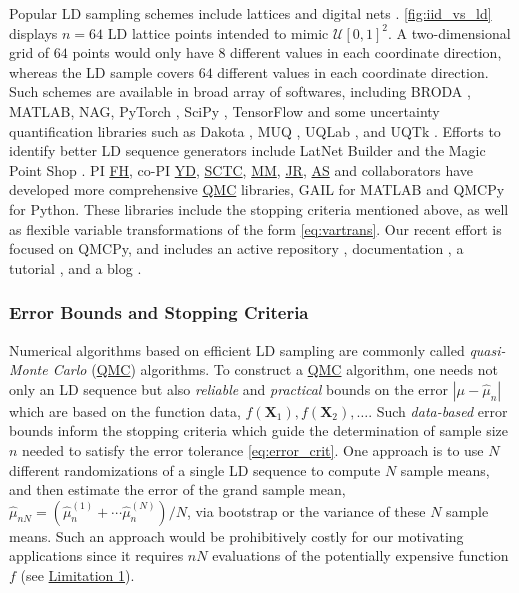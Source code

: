 \documentclass[11pt]{NSFamsart}
\newcommand{\FH}{\hyperlink{FHlink}{FH}\xspace}
\newcommand{\SCTC}{\hyperlink{SCTClink}{SCTC}\xspace}
\newcommand{\MM}{\hyperlink{MMlink}{MM}\xspace}
\newcommand{\YD}{\hyperlink{YDlink}{YD}\xspace}
\newcommand{\JR}{\hyperlink{JRlink}{JR}\xspace}
\newcommand{\AS}{\hyperlink{ASlink}{AS}\xspace}
\newcommand{\QMC}{\hyperlink{QMClink}{QMC}\xspace}
\newcommand{\Limone}{\hyperlink{Lim1link}{Limitation 1}\xspace}
\newcommand{\QMCPy}{QMCPy\xspace}
\newcommand{\NAG}{NAG\xspace}
\newcommand{\MATLAB}{MATLAB\xspace}
\newcommand{\bX}{{\boldsymbol{X}}}
\newcommand{\calu}{{\mathcal{U}}}
\def\abs#1{\ensuremath{\left \lvert #1 \right \rvert}}
\newcommand{\hmu}{\hat{\mu}}
\begin{document}
Popular LD sampling schemes include lattices \cite{Nie92,SloJoe94,DicEtal22a} and digital nets \cite{Nie92,DicPil10a}. \cref{fig:iid_vs_ld} displays $n=64$ LD lattice points intended to mimic $\calu[0,1]^2$.  A two-dimensional grid of $64$ points would only have $8$ different values in each coordinate direction, whereas the LD sample covers $64$ different values in each coordinate direction. Such schemes are available in broad array of softwares, including BRODA \cite{BRODA20a}, \MATLAB \cite{MAT9.9}, \NAG \cite{NAG27}, PyTorch \cite{paszke2019pytorch}, SciPy \cite{virtanen2020scipy}, TensorFlow \cite{tfqf2021a} and some uncertainty quantification libraries such as Dakota \cite{DakotaUsersManual}, MUQ \cite{MUQ}, UQLab \cite{UQLab2014}, and UQTk \cite{DebEtal04,UQTk}.  Efforts to identify better LD sequence generators include LatNet Builder \cite{LatNet} and the Magic Point Shop \cite{Nuy17a}. PI \FH, co-PI \YD, \SCTC, \MM, \JR, \AS and collaborators have developed more comprehensive \QMC libraries, GAIL \cite{ChoEtal21a} for \MATLAB and \QMCPy \cite{QMCPy2020a} for Python.  These libraries include the stopping criteria mentioned above, as well as flexible variable transformations of the form \eqref{eq:vartrans}.  Our recent effort is focused on \QMCPy, and includes an active repository \cite{QMCPy2020a}, documentation \cite{QMCPyDocs}, a tutorial \cite{QMCPyTutMovie2020}, and a blog \cite{QMCBlog}.

\subsubsection{Error Bounds and Stopping Criteria} \label{sec:stopcrit}
Numerical algorithms based on efficient LD sampling are commonly called \hypertarget{QMClink}{\emph{quasi-Monte Carlo}} (\QMC) algorithms. To construct a \QMC algorithm, one needs not only an LD sequence but also \textit{reliable} and \textit{practical} bounds on the error $\abs{\mu - \hmu_n}$ which are based on the function data, $f(\bX_1), f(\bX_2), \ldots$.  Such \textit{data-based} error bounds inform the stopping criteria which guide the determination of sample size $n$ needed to satisfy the error tolerance \eqref{eq:error_crit}. One approach is to use $N$ different randomizations of a single LD sequence to compute $N$ sample means, and then estimate the error of the grand sample mean, $\hmu_{nN} = (\hmu_n^{(1)} +  \cdots \hmu_n^{(N)})/N$, via bootstrap or the variance of these $N$ sample means. Such an approach would be prohibitively costly for our motivating applications since it requires $nN$ evaluations of the potentially expensive function $f$ (see \Limone).
\end{document}
